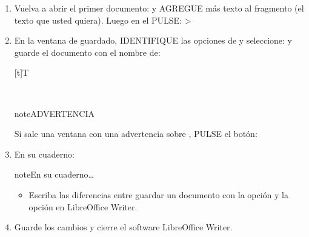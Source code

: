 \documentclass[letterpaper,10pt,spanish]{sphinxmanual}
\let\sphinxpxdimen\pdfpxdimen\else\newdimen\sphinxpxdimen
\begin{document}
\begin{enumerate}
\item {} 
\sphinxAtStartPar
Vuelva a abrir el primer documento:  y AGREGUE más texto al fragmento (el texto que usted quiera). Luego en el  PULSE:  > 

\item {} 
\sphinxAtStartPar
En la ventana de guardado, IDENTIFIQUE las opciones de  y seleccione:  y guarde el documento con el nombre de: 


\begin{savenotes}\sphinxattablestart
\sphinxthistablewithglobalstyle
\centering
\begin{tabulary}{\linewidth}[t]{T}
\sphinxtoprule
\sphinxtableatstartofbodyhook

\begin{sphinxfigure-in-table}
\centering

\noindent\sphinxincludegraphics[width=500\sphinxpxdimen]{{image171}.png}
\end{sphinxfigure-in-table}\relax
\\
\sphinxbottomrule
\end{tabulary}
\sphinxtableafterendhook\par
\sphinxattableend\end{savenotes}

\begin{sphinxadmonition}{note}{ADVERTENCIA}

\sphinxAtStartPar
Si sale una ventana con una advertencia sobre , PULSE el botón:

\sphinxAtStartPar
{}
\end{sphinxadmonition}

\item {} 
\sphinxAtStartPar
En su cuaderno:

\begin{sphinxadmonition}{note}{En su cuaderno…}
\begin{itemize}
\item {} 
\sphinxAtStartPar
Escriba las diferencias entre guardar un documento con la opción  y la opción  en LibreOffice Writer.

\end{itemize}
\end{sphinxadmonition}

\item {} 
\sphinxAtStartPar
Guarde los cambios y cierre el software LibreOffice Writer.

\end{enumerate}
\end{document}
